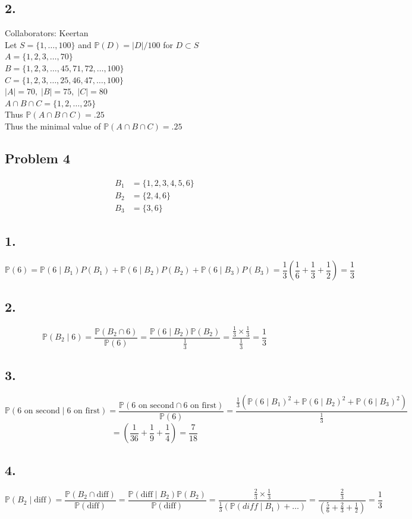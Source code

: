 \documentclass[12pt, letterpaper]{article}
\theoremstyle{definition}
\renewcommand{\P}{\mathbb{P}}
\begin{document}
\subsection*{2.}
Collaborators: Keertan\\
Let $S=\{1,\dots,100\}$ and $\P(D)=|D|/100$ for $D \subset S$\\
$A=\{1,2,3,\dots,70\}$\\
$B=\{1,2,3,\dots,45,71,72,\dots,100\}$\\
$C=\{1,2,3,\dots,25,46,47,\dots,100\}$\\
$|A|=70,\; |B|=75,\; |C|=80$\\
$A\cap B \cap C = \{1,2,\dots,25\}$\\
Thus $\P(A \cap B \cap C)=.25$\\
Thus the minimal value of $\P(A \cap B \cap C)=.25$
\newpage
\subsection*{Problem 4}
\begin{align*}
    B_1&=\{1,2,3,4,5,6\}\\
    B_2&=\{2,4,6\}\\
    B_3&=\{3,6\}
\end{align*}
\subsection*{1.}
\[
\P(6)=\P(6 \mid B_1)P(B_1)+\P(6 \mid B_2)P(B_2)+\P(6 \mid B_3)P(B_3)
     =\dfrac{1}{3}\left( \dfrac{1}{6}+\dfrac{1}{3}+\dfrac{1}{2} \right) = \dfrac{1}{3}
\]
\subsection*{2.}
\[
\P(B_2 \mid 6)=\dfrac{\P(B_2 \cap 6)}{\P(6)}=\dfrac{\P(6 \mid B_2)\P(B_2)}{\frac{1}{3}}=\dfrac{\frac{1}{3}\times\frac{1}{3}}{\frac{1}{3}}=\dfrac{1}{3}
\]
\subsection*{3.}
\[
\P(6 \text{ on second} \mid 6 \text{ on first}) = \dfrac{\P(6 \text{ on second} \cap 6 \text{ on first})}{\P(6)}=\dfrac{\frac{1}{3}(\P(6 \mid B_1)^2+\P(6 \mid B_2)^2+\P(6 \mid B_3)^2)}{\frac{1}{3}}
\]
\[
=\left( \dfrac{1}{36}+\dfrac{1}{9}+\dfrac{1}{4} \right)= \dfrac{7}{18}
\]
\subsection*{4.}
\[
\P(B_2 \mid \text{diff})=\dfrac{\P(B_2 \cap \text{diff})}{\P(\text{diff})}=\dfrac{\P(\text{diff}\mid B_2)\P(B_2)}{\P(\text{diff})}=\dfrac{\frac{2}{3}\times\frac{1}{3}}{\frac{1}{3}(\P(diff \mid B_1)+\dots)}=\dfrac{\frac{2}{3}}{(\frac{5}{6}+\frac{2}{3}+\frac{1}{2})}=\dfrac{1}{3}
\]
\end{document}

